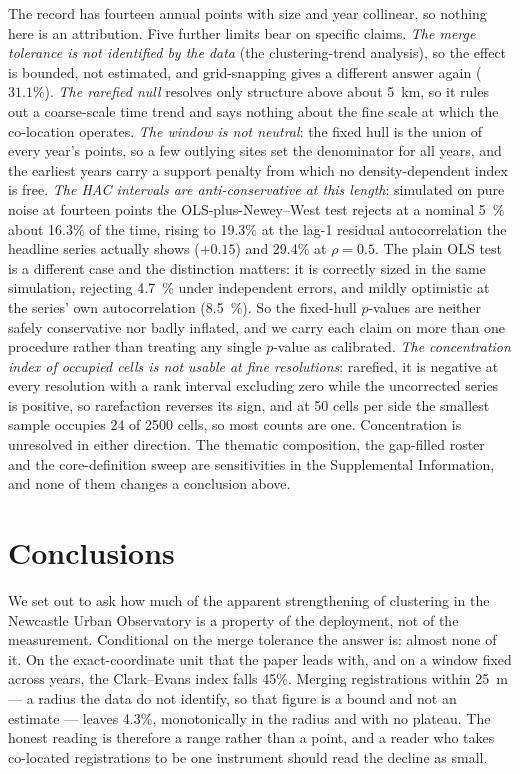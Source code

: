 \documentclass[fleqn,10pt,lineno]{wlpeerj}
\newcommand{\nwSize}{16.3}
\newcommand{\nwSizeAr}{19.3}
\newcommand{\nwSizeArHigh}{29.4}
\newcommand{\olsSizeIid}{4.7}
\newcommand{\olsSizeAr}{8.5}
\newcommand{\locHullDrop}{45}
\newcommand{\gridSnapFall}{31.1}
\begin{document}
The record has fourteen annual points with size and year collinear, so nothing here is an
attribution. Five further limits bear on specific claims. \emph{The merge tolerance is not
identified by the data} (the clustering-trend analysis), so the effect is bounded, not
estimated, and grid-snapping gives a different answer again ($\num{\gridSnapFall}\%$). \emph{The
rarefied null} resolves only structure above about \SI{5}{\kilo\meter}, so it rules out a
coarse-scale time trend and says nothing about the fine scale at which the co-location operates.
\emph{The window is not neutral}: the fixed hull is the union of every year's points, so a few
outlying sites set the denominator for all years, and the earliest years carry a support penalty
from which no density-dependent index is free. \emph{The HAC intervals are anti-conservative at
this length}: simulated on pure noise at fourteen points the OLS-plus-Newey--West test rejects at
a nominal \SI{5}{\percent} about \nwSize\% of the time, rising to \nwSizeAr\% at the lag-1
residual autocorrelation the headline series actually shows ($+0.15$) and \nwSizeArHigh\% at
$\rho = 0.5$. The plain OLS test is a different case and the distinction matters: it is correctly
sized in the same simulation, rejecting \SI{\olsSizeIid}{\percent} under independent errors, and
mildly optimistic at the series' own autocorrelation
(\SI{\olsSizeAr}{\percent}). So the fixed-hull $p$-values are neither safely conservative nor
badly inflated, and we carry each claim on more than one procedure rather than treating any
single $p$-value as calibrated.
\emph{The concentration index
of occupied cells is not usable at fine resolutions}: rarefied, it is negative at every
resolution with a rank interval excluding zero while the uncorrected series is positive, so
rarefaction reverses its sign, and at 50 cells per side the smallest sample occupies 24 of 2500
cells, so most counts are one. Concentration is unresolved in either direction.
The thematic composition, the gap-filled roster and the core-definition sweep are sensitivities
in the Supplemental Information, and none of them changes a conclusion above.

\section*{Conclusions}
\label{sec:conclusions}

We set out to ask how much of the apparent strengthening of clustering in the Newcastle Urban
Observatory is a property of the deployment, not of the measurement. Conditional on the merge
tolerance the answer is: almost none of it. On the exact-coordinate unit that the paper leads
with, and on a window fixed across years, the Clark--Evans index falls \locHullDrop\%. Merging
registrations within \SI{25}{\meter} --- a radius the data do not identify, so that figure is a
bound and not an estimate --- leaves \num{4.3}\%, monotonically in the radius and with no
plateau. The honest reading is therefore a range rather than a point, and a reader who takes
co-located registrations to be one instrument should read the decline as small.
\end{document}
